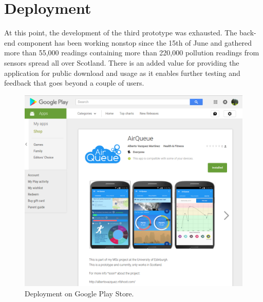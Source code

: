 \section{Deployment}
At this point, the development of the third prototype was exhausted. The back-end component has been working nonstop since the 15th of June and gathered more than 55,000 readings containing more than 220,000 pollution readings from sensors spread all over Scotland. There is an added value for providing the application for public download and usage as it enables further testing and feedback that goes beyond a couple of users.

\begin{figure}[H]
\begin{adjustbox}{width=.8\textwidth,center=\textwidth}
  \centering
  \includegraphics[scale=1]{images/play_store.png}
\end{adjustbox}
  \caption[Deployment on Google Play Store]{Deployment on Google Play Store.\footnotemark}
  \label{fig:deployment_play_store}
\end{figure}

